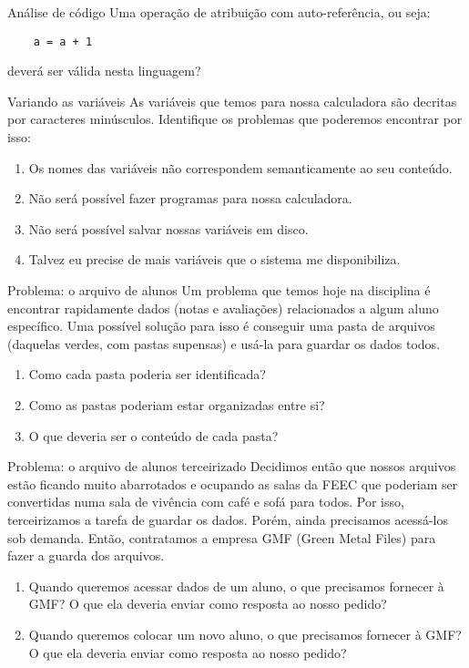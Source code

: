 \documentclass{beamer}
\begin{document}
\begin{frame}[fragile]{Análise de código}
  \centering
  \large
    Uma operação de atribuição com auto-referência, ou seja:

    \begin{verbatim}
    a = a + 1
    \end{verbatim}

    deverá ser válida nesta linguagem?
\end{frame}

\begin{frame}[fragile]{Variando as variáveis}
  \centering
  \large
  As variáveis que temos para nossa calculadora são decritas por caracteres
  minúsculos. Identifique os problemas que poderemos encontrar por isso:
  \begin{enumerate}
    \item Os nomes das variáveis não correspondem semanticamente ao seu
      conteúdo.
    \item Não será possível fazer programas para nossa calculadora.
    \item Não será possível salvar nossas variáveis em disco.
    \item Talvez eu precise de mais variáveis que o sistema me disponibiliza.
  \end{enumerate}
\end{frame}

\begin{frame}{Problema: o arquivo de alunos}
\large
Um problema que temos hoje na disciplina é encontrar rapidamente dados (notas e
  avaliações) relacionados a algum aluno específico. Uma possível solução para
  isso é conseguir uma pasta de arquivos (daquelas verdes, com pastas supensas)
  e usá-la para guardar os dados todos.
  \begin{enumerate}
    \item Como cada pasta poderia ser identificada?
    \item Como as pastas poderiam estar organizadas entre si?
    \item O que deveria ser o conteúdo de cada pasta?
  \end{enumerate}
\end{frame}

\begin{frame}{Problema: o arquivo de alunos terceirizado}
\large
Decidimos então que nossos arquivos estão ficando muito abarrotados e ocupando
  as salas da FEEC que poderiam ser convertidas numa sala de vivência com café e
  sofá para todos. Por isso, terceirizamos a tarefa de guardar os dados. Porém,
  ainda precisamos acessá-los sob demanda. Então, contratamos a empresa
  GMF (Green Metal Files) para fazer a guarda dos arquivos.
  \begin{enumerate}
    \item Quando queremos acessar dados de um aluno, o que precisamos fornecer à
      GMF? O que ela deveria enviar como resposta ao nosso pedido?
    \item Quando queremos colocar um novo aluno, o que precisamos fornecer à
      GMF? O que ela deveria enviar como resposta ao nosso pedido?
  \end{enumerate}
\end{frame}
\end{document}
